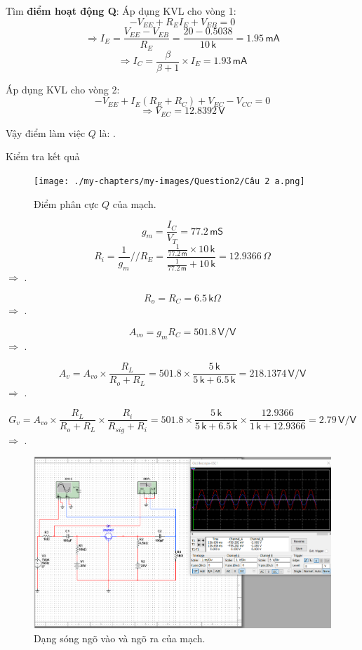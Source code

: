 Tìm \textbf{điểm hoạt động Q}:
Áp dụng KVL cho vòng 1:
\[
- V_{EE}+R_{E}I_{E}+V_{EB}=0
\]
\[
\Rightarrow I_{E}=\frac{V_{EE}-V_{EB}}{R_{E}}=\frac{20-0.5038}{10\,\textsf{k}}=1.95\,\textsf{mA}
\]
\[
\Rightarrow I_{C}=\frac{\beta}{\beta+1}\times I_{E}=1.93\,\textsf{mA}
\]

Áp dụng KVL cho vòng 2:
\[
- V_{EE}+I_{E}(R_{E}+R_{C})+V_{EC}-V_{CC}=0
\]
\[
\Rightarrow V_{EC}=12.8392\,\textsf{V}
\]

Vậy điểm làm việc $Q$ là: .

Kiểm tra kết quả
\begin{figure}[H]
	\centering
	\texttt{[image: ./my-chapters/my-images/Question2/Câu 2 a.png]}
	\caption{Điểm phân cực $Q$ của mạch.}
\end{figure}


\[
g_{m}=\frac{I_{C}}{V_{T}}=77.2\,\textsf{mS}
\]
\[
R_{i}=\frac{1}{g_{m}}//R_{E}=\frac{\frac{1}{77.2\,\textsf{m}}\times10\,\textsf{k}}{\frac{1}{77.2\,\textsf{m}}+10\,\textsf{k}}=12.9366\,\Omega
\]
$\Rightarrow$ .

\[
R_{o}=R_{C}=6.5\,\textsf{k}\Omega
\]
$\Rightarrow$ .

\[
A_{vo}=g_{m}R_{C}=501.8\,\textsf{V/V}
\]
$\Rightarrow$ .

\[
A_{v}=A_{vo}\times\frac{R_{L}}{R_{o}+R_{L}}=501.8\times\frac{5\,\textsf{k}}{5\,\textsf{k}+6.5\,\textsf{k}}=218.1374\,\textsf{V/V}
\]
$\Rightarrow$ .

\[
G_{v}=A_{vo}\times\frac{R_{L}}{R_{o}+R_{L}}\times\frac{R_{i}}{R_{sig}+R_{i}}=501.8\times\frac{5\,\textsf{k}}{5\,\textsf{k}+6.5\,\textsf{k}}\times\frac{12.9366}{1\,\textsf{k}+12.9366}=2.79\,\textsf{V/V}
\]
$\Rightarrow$ .

\begin{figure}[H]
	\centering
	\includegraphics[width=\linewidth]{./my-chapters/my-images/Question2/Câu 2 b - Sóng .png}
	\caption{Dạng sóng ngõ vào và ngõ ra của mạch.}
\end{figure}

